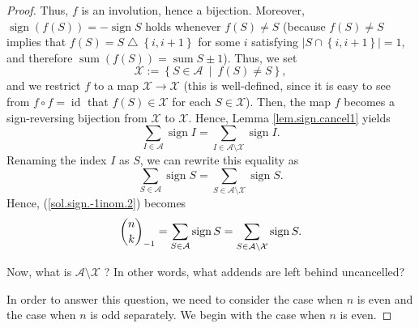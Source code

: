 \begin{proof}
Thus, $f$ is an involution, hence a bijection. Moreover, $\operatorname*{sign}%
\left(  f\left(  S\right)  \right)  =-\operatorname*{sign}S$ holds whenever
$f\left(  S\right)  \neq S$ (because $f\left(  S\right)  \neq S$ implies that
$f\left(  S\right)  =S\bigtriangleup\left\{  i,i+1\right\}  $ for some $i$
satisfying $\left\vert S\cap\left\{  i,i+1\right\}  \right\vert =1$, and
therefore $\operatorname*{sum}\left(  f\left(  S\right)  \right)
=\operatorname*{sum}S\pm1$). Thus, we set%
\[
\mathcal{X}:=\left\{  S\in\mathcal{A}\ \mid\ f\left(  S\right)  \neq
S\right\}  ,
\]
and we restrict $f$ to a map $\mathcal{X}\rightarrow\mathcal{X}$ (this is
well-defined, since it is easy to see from $f\circ f=\operatorname*{id}$ that
$f\left(  S\right)  \in\mathcal{X}$ for each $S\in\mathcal{X}$). Then, the map
$f$ becomes a sign-reversing bijection from $\mathcal{X}$ to $\mathcal{X}$.
Hence, Lemma \ref{lem.sign.cancel1} yields%
\[
\sum_{I\in\mathcal{A}}\operatorname*{sign}I=\sum_{I\in\mathcal{A}%
\setminus\mathcal{X}}\operatorname*{sign}I.
\]
Renaming the index $I$ as $S$, we can rewrite this equality as%
\[
\sum_{S\in\mathcal{A}}\operatorname*{sign}S=\sum_{S\in\mathcal{A}%
\setminus\mathcal{X}}\operatorname*{sign}S.
\]
Hence, (\ref{sol.sign.-1inom.2}) becomes%
\begin{equation}
\dbinom{n}{k}_{-1}=\sum_{S\in\mathcal{A}}\operatorname*{sign}S=\sum
_{S\in\mathcal{A}\setminus\mathcal{X}}\operatorname*{sign}S.
\label{sol.sign.-1inom.3}%
\end{equation}


Now, what is $\mathcal{A}\setminus\mathcal{X}$ ? In other words, what addends
are left behind uncancelled?

In order to answer this question, we need to consider the case when $n$ is
even and the case when $n$ is odd separately. We begin with the case when $n$
is even.


\end{proof}

